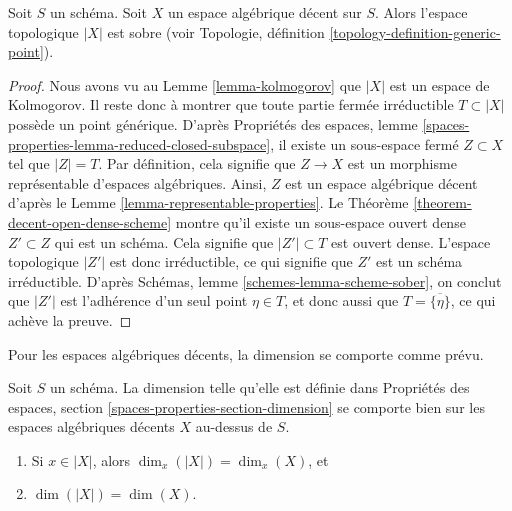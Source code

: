 \begin{proposition}
\label{proposition-reasonable-sober}
Soit $S$ un schéma. Soit $X$ un espace algébrique décent sur $S$.
Alors l'espace topologique $|X|$ est sobre (voir
Topologie, définition \ref{topology-definition-generic-point}).
\end{proposition}

\begin{proof}
Nous avons vu au Lemme \ref{lemma-kolmogorov} que $|X|$ est un espace de
Kolmogorov. Il reste donc à montrer que toute partie fermée irréductible
$T \subset |X|$ possède un point générique. D'après
Propriétés des espaces,
lemme \ref{spaces-properties-lemma-reduced-closed-subspace},
il existe un sous-espace fermé $Z \subset X$ tel que $|Z| = T$.
Par définition, cela signifie que $Z \to X$ est un morphisme représentable
d'espaces algébriques. Ainsi, $Z$ est un espace algébrique décent
d'après le Lemme \ref{lemma-representable-properties}. Le
Théorème \ref{theorem-decent-open-dense-scheme}
montre qu'il existe un sous-espace ouvert dense $Z' \subset Z$ qui est un
schéma. Cela signifie que $|Z'| \subset T$ est ouvert dense.
L'espace topologique $|Z'|$ est donc irréductible, ce qui signifie que
$Z'$ est un schéma irréductible. D'après
Schémas, lemme \ref{schemes-lemma-scheme-sober},
on conclut que $|Z'|$ est l'adhérence d'un seul point $\eta \in T$,
et donc aussi que $T = \overline{\{\eta\}}$, ce qui achève la preuve.
\end{proof}

\noindent
Pour les espaces algébriques décents, la dimension se comporte comme prévu.

\begin{lemma}
\label{lemma-dimension-decent-space}
Soit $S$ un schéma. La dimension telle qu'elle est définie dans
Propriétés des espaces, section \ref{spaces-properties-section-dimension}
se comporte bien sur les espaces algébriques décents $X$ au-dessus de $S$.
\begin{enumerate}
\item Si $x \in |X|$, alors $\dim_x(|X|) = \dim_x(X)$, et
\item $\dim(|X|) = \dim(X)$.
\end{enumerate}
\end{lemma}

